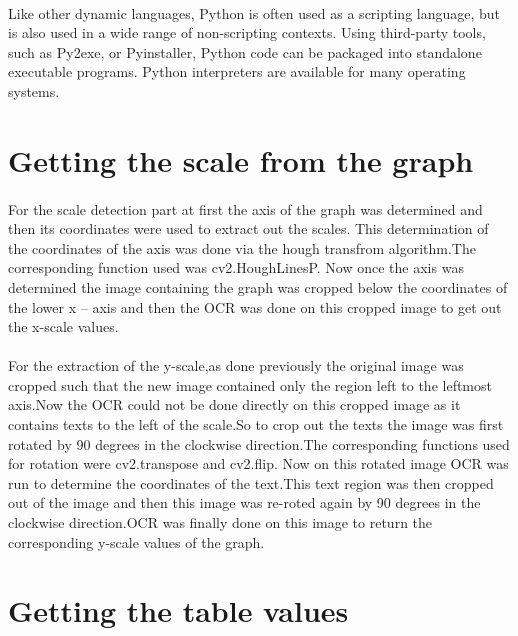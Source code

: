 \documentclass[a4paper,10pt]{scrreprt}
\begin{document}
\paragraph{}
Like other dynamic languages, Python is often used as a scripting language, but is also used in a wide range of non-scripting contexts. Using third-party tools, such as Py2exe, or Pyinstaller, Python code can be packaged into standalone executable programs. Python interpreters are available for many operating systems.

\section{Getting the scale from the graph}
\paragraph{}
For the scale detection part at first the axis of the graph was determined and then its coordinates were used to extract out the scales. This determination of the coordinates of the axis was done via the hough transfrom algorithm.The corresponding function used was cv2.HoughLinesP.
Now once the axis was determined the image containing the graph was cropped below the coordinates of the lower x – axis and then the OCR was done on this cropped image to get out the x-scale values.
\paragraph{}
For the extraction of the y-scale,as done previously the original image was cropped such that the new image contained only the region left to the leftmost axis.Now the OCR could not be done directly on this cropped image as it contains texts to the left of the scale.So to crop out the texts the image was first rotated by 90 degrees in the clockwise direction.The corresponding functions used for rotation were cv2.transpose
 and cv2.flip. Now on this rotated image OCR was run to determine the coordinates of the text.This text region was then cropped out of the image and then this image was re-roted again by 90 degrees in the clockwise direction.OCR was finally done on this image to return the corresponding y-scale values of the graph.
\section{Getting the table values}
\end{document}
